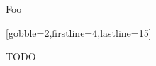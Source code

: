 \documentclass{stex}
\begin{document}

  \begin{blindfragment}
  \end{blindfragment}
  
  Foo
  
  [gobble=2,firstline=4,lastline=15]
  
  

  \begin{sfragment}{TODO}

    \begin{function}{\ifstexhtml}
    \end{function}
    
  \end{sfragment}
\end{document}

